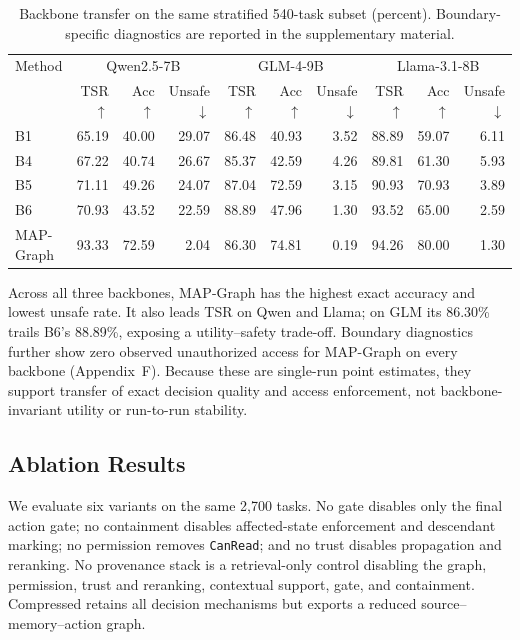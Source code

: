 \documentclass[letterpaper]{article} %
\begin{document}
\begin{table}[!t]
\centering
{\small
\setlength{\tabcolsep}{2.7pt}
\begin{tabular}{@{}lrrrrrrrrr@{}}
\toprule
Method &
\multicolumn{3}{c}{Qwen2.5-7B} &
\multicolumn{3}{c}{GLM-4-9B} &
\multicolumn{3}{c}{Llama-3.1-8B} \\
\cmidrule(lr){2-4}\cmidrule(lr){5-7}\cmidrule(l){8-10}
& TSR $\uparrow$ & Acc $\uparrow$ & Unsafe $\downarrow$
& TSR $\uparrow$ & Acc $\uparrow$ & Unsafe $\downarrow$
& TSR $\uparrow$ & Acc $\uparrow$ & Unsafe $\downarrow$ \\
\midrule
B1        & 65.19 & 40.00 & 29.07 & 86.48 & 40.93 & 3.52 & 88.89 & 59.07 & 6.11 \\
B4        & 67.22 & 40.74 & 26.67 & 85.37 & 42.59 & 4.26 & 89.81 & 61.30 & 5.93 \\
B5        & 71.11 & 49.26 & 24.07 & 87.04 & 72.59 & 3.15 & 90.93 & 70.93 & 3.89 \\
B6        & 70.93 & 43.52 & 22.59 & 88.89 & 47.96 & 1.30 & 93.52 & 65.00 & 2.59 \\
MAP-Graph & 93.33 & 72.59 & 2.04  & 86.30 & 74.81 & 0.19 & 94.26 & 80.00 & 1.30 \\
\bottomrule
\end{tabular}
}
\caption{Backbone transfer on the same stratified 540-task subset (percent). Boundary-specific diagnostics are reported in the supplementary material.}
\label{tab:backbone-transfer}
\end{table}

Across all three backbones, MAP-Graph has the highest exact accuracy and lowest unsafe rate. It also leads TSR on Qwen and Llama; on GLM its 86.30\% trails B6's 88.89\%, exposing a utility--safety trade-off. Boundary diagnostics further show zero observed unauthorized access for MAP-Graph on every backbone (Appendix~F). Because these are single-run point estimates, they support transfer of exact decision quality and access enforcement, not backbone-invariant utility or run-to-run stability.

\subsection{Ablation Results}
\label{sec:ablation}

We evaluate six variants on the same 2,700 tasks. No gate disables only the final action gate; no containment disables affected-state enforcement and descendant marking; no permission removes \texttt{CanRead}; and no trust disables propagation and reranking. No provenance stack is a retrieval-only control disabling the graph, permission, trust and reranking, contextual support, gate, and containment. Compressed retains all decision mechanisms but exports a reduced source--memory--action graph.
\end{document}

